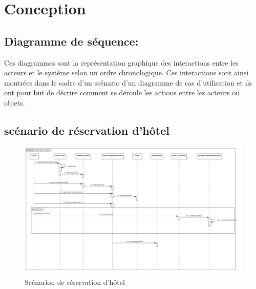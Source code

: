 \documentclass[12pt,a4paper]{report}
\begin{document}
			

	
		\newpage
		\section{Conception}
			\subsection{Diagramme de séquence:} 
Ces diagrammes sont la représentation graphique des interactions entre les acteurs et le
système selon un ordre chronologique. Ces interactions sont ainsi montrées dans le cadre d'un
scénario d'un diagramme de cas d'utilisation et ils ont pour but de décrire comment se déroule les
actions entre les acteurs ou objets.
			
			\subsection{scénario de réservation d'hôtel}
			\vspace{1cm}
			\begin{figure}[!hbtp]
				\centering
				\includegraphics[scale=0.31]{./graphics/scenario_reservation.jpg}
				\caption{Scénarion de réservation d'hôtel}
			\end{figure}

			\newpage
			
\end{document}
